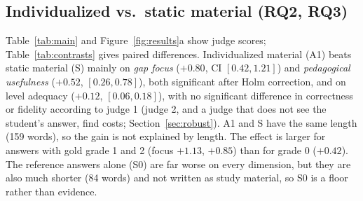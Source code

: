\documentclass[11pt]{article}
\begin{document}
\begin{table}[t]
\centering\small

\caption{Confusion matrix of baseline (\textbf{v0}) estimated vs.\ gold grade (E0, $n{=}595$).}
\label{tab:confusion}
\end{table}

\begin{table}[t]
\centering\small

\caption{Diagnosis calibration on PT-ASAG E0 ($n{=}595$; \texttt{gpt-4o-mini}, temp.\ $0$). $\Delta$QWK CIs use $5{,}000$ question-clustered bootstrap resamples; $^{*}$: Holm-adjusted $p{<}0.05$ across the two calibration contrasts vs.\ \textbf{v0}. \textit{3-gap} / \textit{Err ($g{=}3$)}: share of gold-$3$ answers receiving 3 forced gaps or $\ge 1$ conceptual error. Bottom row shows 15-fold LOGO post-hoc thresholding on \textbf{v0} features for reference.}
\label{tab:rq1_calib}
\end{table}

\subsection{Individualized vs.\ static material (RQ2, RQ3)}
Table~\ref{tab:main} and Figure~\ref{fig:results}a show judge scores; Table~\ref{tab:contrasts} gives paired differences. Individualized material (A1) beats static material (S) mainly on \emph{gap focus} ($+0.80$, CI $[0.42, 1.21]$) and \emph{pedagogical usefulness} ($+0.52$, $[0.26, 0.78]$), both significant after Holm correction, and on level adequacy ($+0.12$, $[0.06, 0.18]$), with no significant difference in correctness or fidelity according to judge 1 (judge 2, and a judge that does not see the student's answer, find costs; Section~\ref{sec:robust}). A1 and S have the same length (159 words), so the gain is not explained by length. The effect is larger for answers with gold grade 1 and 2 (focus $+1.13$, $+0.85$) than for grade 0 ($+0.42$). The reference answers alone (S0) are far worse on every dimension, but they are also much shorter (84 words) and not written as study material, so S0 is a floor rather than evidence.

\begin{table}[t]
\centering\small

\caption{Mean judge scores (1--5) on 180 pilot items. Words: mean length; Incorr.: mean incorrect claims per text per the judge. Bold: best among S, A0, A1, A2 (ties both bold). 95\% intervals are in Figure~\ref{fig:results}a.}
\label{tab:main}
\end{table}
\end{document}
